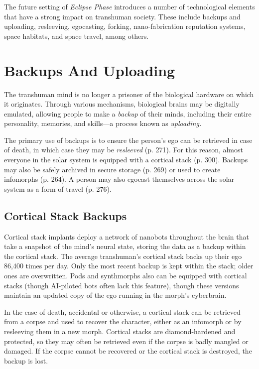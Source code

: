 The future setting of \textit{Eclipse Phase} introduces a 
number of technological elements that have a strong 
impact on transhuman society. These include backups 
and uploading, resleeving, egocasting, forking, nano-fabrication
reputation systems, space habitats, and
space travel, among others.

\section{Backups And Uploading}

The transhuman mind is no longer a prisoner of the 
biological hardware on which it originates. Through 
various mechanisms, biological brains may be digitally 
emulated, allowing people to make a \textit{backup }of their 
minds, including their entire personality, memories, 
and skills—a process known as \textit{uploading.}

The primary use of backups is to ensure the person's 
ego can be retrieved in case of death, in which case 
they may be \textit{resleeved} (p. 271). For this reason, almost 
everyone in the solar system is equipped with a cortical
stack (p. 300). Backups may also be safely archived
in secure storage (p. 269) or used to create infomorphs 
(p. 264). A person may also egocast themselves across 
the solar system as a form of travel (p. 276).

\subsection{Cortical Stack Backups}

Cortical stack implants deploy a network of nanobots
throughout the brain that take a snapshot of
the mind's neural state, storing the data as a backup 
within the cortical stack. The average transhuman's 
cortical stack backs up their ego 86,400 times per day. 
Only the most recent backup is kept within the stack; 
older ones are overwritten. Pods and synthmorphs 
also can be equipped with cortical stacks (though 
AI-piloted bots often lack this feature), though these 
versions maintain an updated copy of the ego running 
in the morph's cyberbrain.

In the case of death, accidental or otherwise, a cortical
stack can be retrieved from a corpse and used to
recover the character, either as an infomorph or by 
resleeving them in a new morph. Cortical stacks are 
diamond-hardened and protected, so they may often 
be retrieved even if the corpse is badly mangled or 
damaged. If the corpse cannot be recovered or the 
cortical stack is destroyed, the backup is lost.

